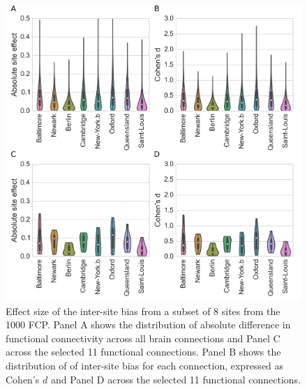\documentclass[authoryear]{elsarticle}
\begin{document}
\begin{figure}[htbp]
\begin{center}
\includegraphics[width=0.8\linewidth]{../figures/effect_distribution.png}
\end{center}
\caption[inter site variability]{
Effect size of the inter-site bias from a subset of 8 sites from the 1000 FCP. Panel A shows the distribution of absolute difference in functional connectivity across all brain connections and Panel C across the selected 11 functional connections. Panel B shows the distribution of of inter-site bias for each connection, expressed as Cohen's $d$ and Panel D across the selected 11 functional connections.
}
\label{fig_site_variability}
\end{figure}
\end{document}
